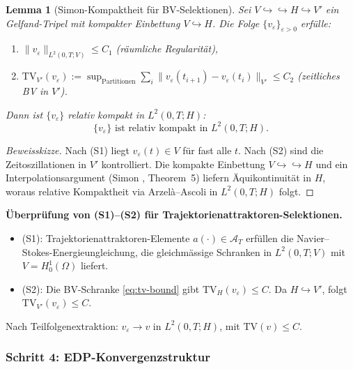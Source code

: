 \documentclass[12pt,a4paper]{article}
\theoremstyle{definition}
\theoremstyle{plain}
\newtheorem{lemma}[definition]{Lemma}
\theoremstyle{remark}
\begin{document}
\begin{lemma}[Simon-Kompaktheit f\"ur BV-Selektionen]\label{lem:simon-bv}
Sei $V \hookrightarrow\!\!\!\hookrightarrow H \hookrightarrow V'$ ein Gelfand-Tripel mit kompakter Einbettung $V \hookrightarrow H$. Die Folge $\{v_\varepsilon\}_{\varepsilon > 0}$ erf\"ulle:
\begin{enumerate}
\item[\textup{(S1)}] $\|v_\varepsilon\|_{L^2(0,T;V)} \leq C_1$ \quad (r\"aumliche Regularit\"at),
\item[\textup{(S2)}] $\mathrm{TV}_{V'}(v_\varepsilon) := \sup_{\text{Partitionen}} \sum_i \|v_\varepsilon(t_{i+1}) - v_\varepsilon(t_i)\|_{V'} \leq C_2$ \quad (zeitliches BV in $V'$).
\end{enumerate}
Dann ist $\{v_\varepsilon\}$ relativ kompakt in $L^2(0,T;H)$:
\begin{equation}\label{eq:aubin-lions}
  \{v_\varepsilon\} \text{ ist relativ kompakt in } L^2(0,T;H).
\end{equation}
\end{lemma}

\begin{proof}[Beweisskizze]
Nach (S1) liegt $v_\varepsilon(t) \in V$ für fast alle $t$. Nach (S2) sind die Zeitoszillationen in $V'$ kontrolliert. Die kompakte Einbettung $V \hookrightarrow\!\!\!\hookrightarrow H$ und ein Interpolationsargument (Simon \cite{Simon1987}, Theorem~5) liefern Äquikontinuität in $H$, woraus relative Kompaktheit via Arzel\`a--Ascoli in $L^2(0,T;H)$ folgt.
\end{proof}

\noindent\textbf{\"Uberpr\"ufung von (S1)--(S2) f\"ur Trajektorienattraktoren-Selektionen.}
\begin{itemize}
\item (S1): Trajektorienattraktoren-Elemente $a(\cdot) \in \mathcal{A}_T$ erf\"ullen die Navier--Stokes-Energieungleichung, die gleichm\"assige Schranken in $L^2(0,T;V)$ mit $V = H^1_0(\Omega)$ liefert.
\item (S2): Die BV-Schranke \eqref{eq:tv-bound} gibt $\mathrm{TV}_H(v_\varepsilon) \leq C$. Da $H \hookrightarrow V'$, folgt $\mathrm{TV}_{V'}(v_\varepsilon) \leq C$.
\end{itemize}
Nach Teilfolgenextraktion: $v_\varepsilon \to v$ in $L^2(0,T;H)$, mit $\mathrm{TV}(v) \leq C$.

\subsubsection*{Schritt 4: EDP-Konvergenzstruktur}
\end{document}
